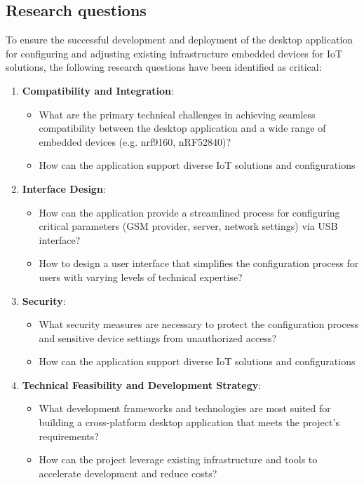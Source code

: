 \documentclass[a4paper, 11pt]{article}
\begin{document}
\subsection{Research questions}
To ensure the successful development and deployment of the desktop application for configuring and adjusting existing infrastructure embedded devices for IoT solutions, the following research questions have been identified as critical:
\begin{enumerate}
  \item \textbf{Compatibility and Integration}:
  \begin{itemize}
    \item What are the primary technical challenges in achieving seamless compatibility between the desktop application and a wide range of embedded devices (e.g. nrf9160, nRF52840)?
    \item How can the application support diverse IoT solutions and configurations
\end{itemize}
  \item \textbf{Interface Design}:
  \begin{itemize}
    \item How can the application provide a streamlined process for configuring critical parameters (GSM provider, server, network settings) via USB interface?
    \item How to design a user interface that simplifies the configuration process for users with varying levels of technical expertise?
\end{itemize}
  \item \textbf{Security}:
  \begin{itemize}
    \item What security measures are necessary to protect the configuration process and sensitive device settings from unauthorized access?
    \item How can the application support diverse IoT solutions and configurations
\end{itemize}
  \item \textbf{Technical Feasibility and Development Strategy}:
  \begin{itemize}
    \item What development frameworks and technologies are most suited for building a cross-platform desktop application that meets the project's requirements?
    \item How can the project leverage existing infrastructure and tools to accelerate development and reduce costs?
\end{itemize}
\end{enumerate}
\end{document}
